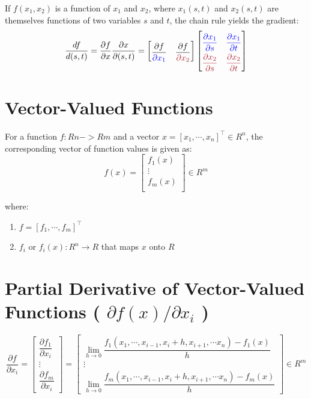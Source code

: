 If $f(x_1, x_2)$ is a function of $x_1$ and $x_2$, where $x_1(s, t)$ and $x_2(s, t)$ are themselves functions of two variables $s$ and $t$, the chain rule yields the gradient:
\[
    \renewcommand{\arraystretch}{2}
    \dfrac{df}{d(s,t)} =
    \dfrac{\partial f}{\partial x}
    \dfrac{\partial x}{\partial (s,t)} =
    \begin{bmatrix}
        \dfrac{\partial f}{\textcolor{blue}{\partial x_1}} &
        \dfrac{\partial f}{\textcolor{Maroon}{\partial x_2}}
    \end{bmatrix}
    \begin{bmatrix}
        \textcolor{blue}{\dfrac{\partial x_1}{\partial s}} &
        \textcolor{blue}{\dfrac{\partial x_1}{\partial t}}\\
        \textcolor{Maroon}{\dfrac{\partial x_2}{\partial s}} &
        \textcolor{Maroon}{\dfrac{\partial x_2}{\partial t}}\\
    \end{bmatrix}
\]

\section{Vector-Valued Functions}\label{Vector-Valued Functions}
For a function $f : Rn -> Rm$ and a vector $x = [x_1, \cdots , x_n]^\top \in R^n$, the corresponding vector of function values is given as:
\[
    f(x) = 
    \begin{bmatrix}
        f_1(x)\\
        \vdots\\
        f_m(x)\\
    \end{bmatrix}
    \in R^m
\]

where:
\begin{enumerate}
    \item $f =  [f_1, \cdots , f_m]^\top$

    \item $f_i$ or $f_i(x) : R^n \to R$ that maps $x$ onto $R$
\end{enumerate}

\section{Partial Derivative of Vector-Valued Functions ( $\partial f(x)/\partial x_i$ )}\label{Partial Derivative of Vector-Valued Functions}

\[
    \dfrac{\partial f}{\partial x_i}=
    \begin{bmatrix}
        \dfrac{\partial f_1}{\partial x_i} \\
        \vdots \\
        \dfrac{\partial f_m}{\partial x_i}
    \end{bmatrix} =
    \begin{bmatrix}
        \displaystyle\lim_{h \to 0} \dfrac{ f_1(x_1,\cdots ,x_{i-1},x_i+h,x_{i+1},\cdots x_n) - f_1(x)}{h} \\
        \vdots \\
        \displaystyle\lim_{h \to 0} \dfrac{f_m(x_1,\cdots ,x_{i-1},x_i+h,x_{i+1},\cdots x_n) - f_m(x)}{h}
    \end{bmatrix}
    \in R^m
\]


